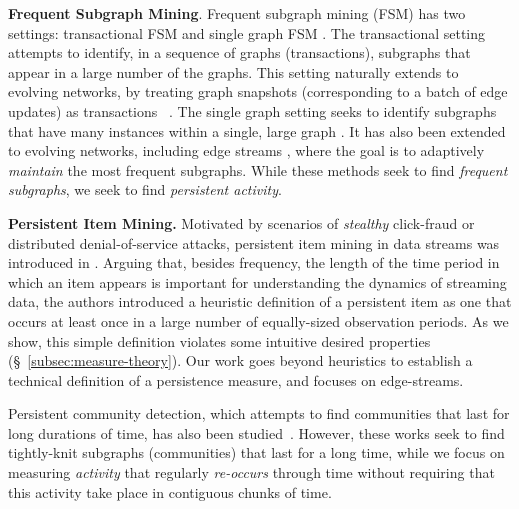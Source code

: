 \documentclass[sigconf]{acmart}
\begin{document}
\vspace{0.1cm}
\noindent
\textbf{Frequent Subgraph Mining}. Frequent subgraph mining (FSM) has two settings: transactional FSM and single graph FSM \cite{jiang2013survey}. The transactional setting attempts to identify, in a sequence of graphs (transactions), subgraphs that appear in a large number of the graphs. 
This setting naturally extends to evolving networks, by treating graph snapshots 
(corresponding to a batch of edge updates) as transactions  ~\cite{ray2014frequent}.
The single graph setting seeks to identify subgraphs that have many instances within a single, large graph \cite{elseidy2014grami}. 
It has also been extended to evolving networks, including edge streams \cite{aggarwal2010dense, abdelhamid2017incremental, aslay2018mining}, where the goal is to adaptively \emph{maintain} the most frequent subgraphs. 
While these methods seek to find \emph{frequent subgraphs}, we seek to find \emph{persistent activity}.


\vspace{0.1cm}
\noindent
\textbf{Persistent Item Mining.} Motivated by scenarios of \textit{stealthy} click-fraud or distributed denial-of-service attacks, persistent item mining in data streams was introduced in \cite{dai2016finding}. 
Arguing that, besides frequency, the length of the time period in which an item appears is important for understanding the dynamics of streaming data, the authors introduced a heuristic definition of a persistent item as one that occurs at least once in a large number of equally-sized observation periods.
As we show, this simple definition violates some intuitive desired properties (\S~\ref{subsec:measure-theory}). Our work goes beyond heuristics to establish a technical definition of a persistence measure, and focuses on edge-streams. 

Persistent community detection, which attempts to find communities that last for long durations of time, has also been studied~\cite{semertzidis2019finding,li2018persistent}. However, these works seek to find tightly-knit subgraphs (communities) that last for a long time, while we focus on measuring \textit{activity} that regularly \textit{re-occurs} through time 
without requiring that this activity take place in contiguous chunks of time.
\end{document}
